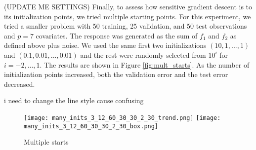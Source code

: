 \documentclass[12pt,letterpaper]{article}
\begin{document}
(UPDATE ME SETTINGS)
Finally, to assess how sensitive gradient descent is to its initialization points, we tried multiple starting points. For this experiment, we tried a smaller problem with 50 training, 25 validation, and 50 test observations and $p = 7$ covariates. The response was generated as the sum of $f_1$ and $f_2$ as defined above plus noise. We used the same first two initializations $(10, 1, ..., 1)$ and $(0.1, 0.01, ..., 0.01)$ and the rest were randomly selected from $10^i$ for $i = -2, ..., 1$. The results are shown in Figure \ref{fig:mult_starts}. As the number of initialization points increased, both the validation error and the test error decreased.

i need to change the line style cause confusing
\begin{figure}
	\caption{Multiple starts}
	\centering
	\texttt{[image: many\_inits\_3\_12\_60\_30\_30\_2\_30\_trend.png]}
	\texttt{[image: many\_inits\_3\_12\_60\_30\_30\_2\_30\_box.png]}
\end{figure}
\end{document}
